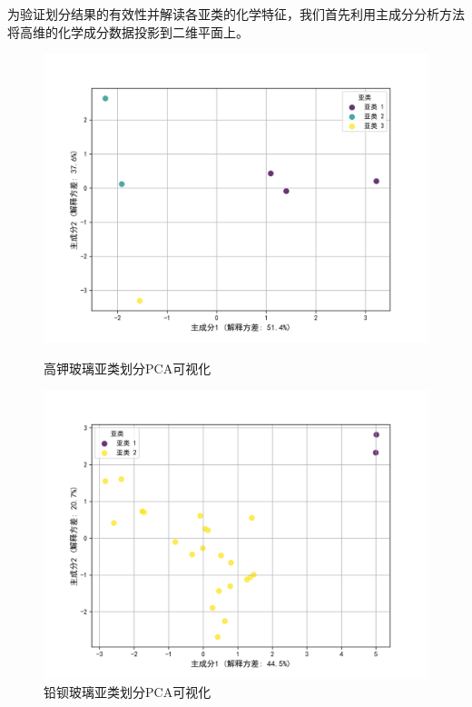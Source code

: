 为验证划分结果的有效性并解读各亚类的化学特征，我们首先利用主成分分析方法将高维的化学成分数据投影到二维平面上。

\begin{figure}[H]
    \centering
    \begin{minipage}{0.48\textwidth}
        \centering
        \includegraphics[width=\linewidth]{figs/4问题二/高钾玻璃_亚类PCA图.png}
        \caption{高钾玻璃亚类划分PCA可视化}
        \label{fig:pca_k}
    \end{minipage}\hfill
    \begin{minipage}{0.48\textwidth}
        \centering
        \includegraphics[width=\linewidth]{figs/4问题二/铅钡玻璃_亚类PCA图.png}
        \caption{铅钡玻璃亚类划分PCA可视化}
        \label{fig:pca_pb}
    \end{minipage}
\end{figure}

